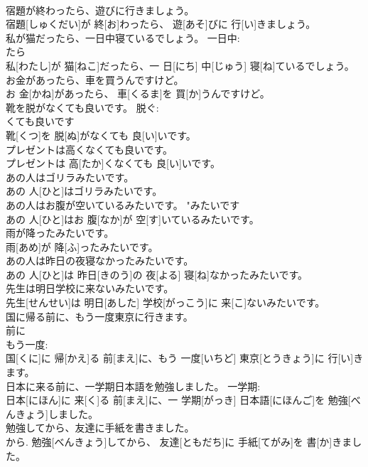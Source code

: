 \documentclass[8pt]{extreport}
\begin{document}
\begin{CJK}{UTF8}{min}
\\	宿題が終わったら、遊びに行きましょう。	
\\	宿題[しゅくだい]が 終[お]わったら、 遊[あそ]びに 行[い]きましょう。	
\\	私が猫だったら、一日中寝ているでしょう。	一日中: 
\\	たら 
\\	私[わたし]が 猫[ねこ]だったら、一 日[にち] 中[じゅう] 寝[ね]ているでしょう。	
\\	お金があったら、車を買うんですけど。	
\\	お 金[かね]があったら、 車[くるま]を 買[か]うんですけど。	
\\	靴を脱がなくても良いです。	脱ぐ: 
\\	くても良いです
\\	靴[くつ]を 脱[ぬ]がなくても 良[い]いです。	
\\	プレゼントは高くなくても良いです。	
\\	プレゼントは 高[たか]くなくても 良[い]いです。	
\\	あの人はゴリラみたいです。	
\\	あの 人[ひと]はゴリラみたいです。	
\\	あの人はお腹が空いているみたいです。	"みたいです 
\\	あの 人[ひと]はお 腹[なか]が 空[す]いているみたいです。	
\\	雨が降ったみたいです。	
\\	雨[あめ]が 降[ふ]ったみたいです。	
\\	あの人は昨日の夜寝なかったみたいです。	
\\	あの 人[ひと]は 昨日[きのう]の 夜[よる] 寝[ね]なかったみたいです。	
\\	先生は明日学校に来ないみたいです。	
\\	先生[せんせい]は 明日[あした] 学校[がっこう]に 来[こ]ないみたいです。	
\\	国に帰る前に、もう一度東京に行きます。	
\\	前に 
\\	もう一度: 
\\	国[くに]に 帰[かえ]る 前[まえ]に、もう 一度[いちど] 東京[とうきょう]に 行[い]きます。	
\\	日本に来る前に、一学期日本語を勉強しました。	一学期: 
\\	日本[にほん]に 来[く]る 前[まえ]に、一 学期[がっき] 日本語[にほんご]を 勉強[べんきょう]しました。	
\\	勉強してから、友達に手紙を書きました。	
\\	から.	勉強[べんきょう]してから、 友達[ともだち]に 手紙[てがみ]を 書[か]きました。	

\end{CJK}
\end{document}

